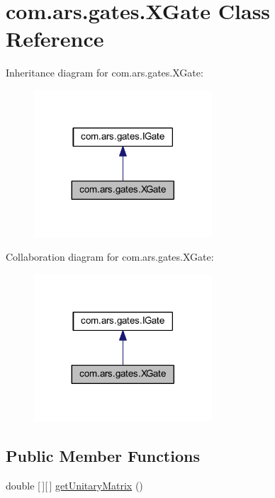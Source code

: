 \hypertarget{classcom_1_1ars_1_1gates_1_1_x_gate}{}\section{com.\+ars.\+gates.\+X\+Gate Class Reference}
\label{classcom_1_1ars_1_1gates_1_1_x_gate}


Inheritance diagram for com.\+ars.\+gates.\+X\+Gate\+:\nopagebreak
\begin{figure}[H]
\begin{center}
\leavevmode
\includegraphics[width=188pt]{classcom_1_1ars_1_1gates_1_1_x_gate__inherit__graph}
\end{center}
\end{figure}


Collaboration diagram for com.\+ars.\+gates.\+X\+Gate\+:\nopagebreak
\begin{figure}[H]
\begin{center}
\leavevmode
\includegraphics[width=188pt]{classcom_1_1ars_1_1gates_1_1_x_gate__coll__graph}
\end{center}
\end{figure}
\subsection*{Public Member Functions}
\begin{DoxyCompactItemize}
\item 
double \mbox{[}$\,$\mbox{]}\mbox{[}$\,$\mbox{]} \hyperlink{classcom_1_1ars_1_1gates_1_1_x_gate_aa0e495ad8fa7fd0e23ecea6f01c02f6e}{get\+Unitary\+Matrix} ()
\end{DoxyCompactItemize}


